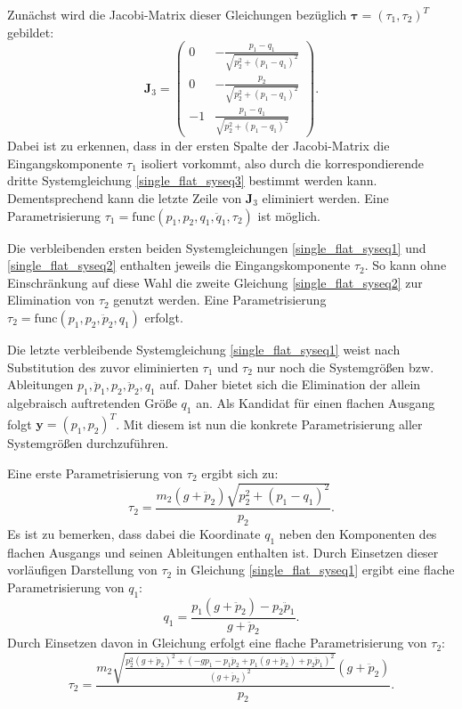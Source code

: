Zunächst wird die Jacobi-Matrix dieser Gleichungen bezüglich $\boldsymbol{\tau} = (\tau_1, \tau_2)^T$ gebildet:
\begin{equation}
	\mathbf{J}_3 =
	\left(\begin{matrix}
		0 & - \frac{p_{1} - q_{1}}{\sqrt{p_{2}^{2} + \left(p_{1} - q_{1}\right)^{2}}}\\
		0 & - \frac{p_{2}}{\sqrt{p_{2}^{2} + \left(p_{1} - q_{1}\right)^{2}}}\\
		-1 & \frac{p_{1} - q_{1}}{\sqrt{p_{2}^{2} + \left(p_{1} - q_{1}\right)^{2}}}
	\end{matrix}\right).
\end{equation}
Dabei ist zu erkennen, dass in der ersten Spalte der Jacobi-Matrix die Eingangskomponente $\tau_{1}$ isoliert vorkommt, also durch die korrespondierende dritte Systemgleichung \eqref{single_flat_syseq3} bestimmt werden kann. Dementsprechend kann die letzte Zeile von $\mathbf{J}_3$ eliminiert werden. Eine Parametrisierung $\tau_1 = \mathrm{func}(p_1, p_2, q_1, \ddot{q}_1, \tau_2)$ ist möglich.

Die verbleibenden ersten beiden Systemgleichungen \eqref{single_flat_syseq1} und \eqref{single_flat_syseq2} enthalten jeweils die Eingangskomponente $\tau_2$. So kann ohne Einschränkung auf diese Wahl die zweite Gleichung \eqref{single_flat_syseq2} zur Elimination von $\tau_2$ genutzt werden. Eine Parametrisierung ${\tau_2 = \mathrm{func}(p_1, p_2, \ddot{p}_2, q_1)}$ erfolgt.

Die letzte verbleibende Systemgleichung \eqref{single_flat_syseq1} weist nach Substitution des zuvor eliminierten $\tau_1$ und $\tau_2$ nur noch die Systemgrößen bzw. Ableitungen $p_1, \ddot{p}_1, p_2, \ddot{p}_2, q_1$ auf. Daher bietet sich die Elimination der allein algebraisch auftretenden Größe $q_1$ an. Als Kandidat für einen flachen Ausgang folgt
$\mathbf{y} = (p_1, p_2)^T$. Mit diesem ist nun die konkrete Parametrisierung aller Systemgrößen durchzuführen.

Eine erste Parametrisierung von $\tau_2$ ergibt sich zu:
\begin{equation}
	\label{eq:pre_single_crane_tau2_w_q1}
	\tau_2 = \frac{m_{2} \left(g + \ddot{p}_{2}\right) \sqrt{p_{2}^{2} + \left(p_{1} - q_{1}\right)^{2}}}{p_{2}}.
\end{equation}
Es ist zu bemerken, dass dabei die Koordinate $q_1$ neben den Komponenten des flachen Ausgangs und seinen Ableitungen enthalten ist. Durch Einsetzen dieser vorläufigen Darstellung von $\tau_2$ in Gleichung \eqref{single_flat_syseq1} ergibt eine flache Parametrisierung von $q_1$:
\begin{equation}
	q_1 = \frac{p_{1} \left(g + \ddot{p}_{2}\right) - p_{2} \ddot{p}_{1}}{g + \ddot{p}_{2}}.
\end{equation}
Durch Einsetzen davon in Gleichung \label{eq:pre_single_crane_tau2_w_q1} erfolgt eine flache Parametrisierung von $\tau_2$:
\begin{equation}
	\tau_2 =
	\frac{m_{2} \sqrt{\frac{p_{2}^{2} \left(g + \ddot{p}_{2}\right)^{2} + \left(- g p_{1} - p_{1} \ddot{p}_{2} + p_{1} \left(g + \ddot{p}_{2}\right) + p_{2} \ddot{p}_{1}\right)^{2}}{\left(g + \ddot{p}_{2}\right)^{2}}} \left(g + \ddot{p}_{2}\right)}{p_{2}}.
\end{equation}

